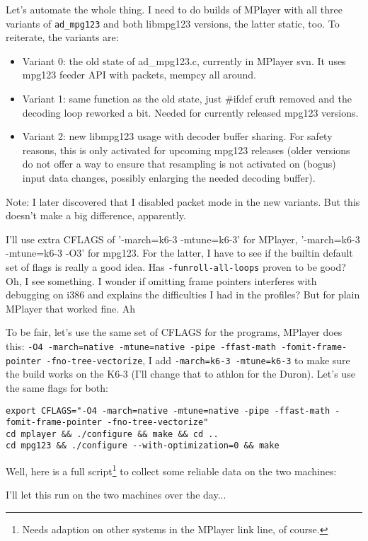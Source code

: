 \documentclass[a4paper,12pt]{scrartcl}
\begin{document}
Let's automate the whole thing. I need to do builds of MPlayer with all three variants of \verb:ad_mpg123: and both libmpg123 versions, the latter static, too.
To reiterate, the variants are:
\begin{itemize}
	\item Variant 0: the old state of ad\_mpg123.c, currently in MPlayer svn. It uses mpg123 feeder API with packets,  mempcy all around.
	\item Variant 1: same function as the old state, just \#ifdef cruft removed and the decoding loop reworked a bit. Needed for currently released mpg123 versions.
	\item Variant 2: new libmpg123 usage with decoder buffer sharing. For safety reasons, this is only activated for upcoming mpg123 releases (older versions do not offer a way to ensure that resampling is not activated on (bogus) input data changes, possibly enlarging the needed decoding buffer).
\end{itemize}
Note: I later discovered that I disabled packet mode in the new variants. But this doesn't make a big difference, apparently.

I'll use extra CFLAGS of '-march=k6-3 -mtune=k6-3' for MPlayer, '-march=k6-3 -mtune=k6-3 -O3' for mpg123. For the latter, I have to see if the builtin default set of flags is really a good idea. Has \verb:-funroll-all-loops: proven to be good? Oh, I see something. I wonder if omitting frame pointers interferes with debugging on i386 and explains the difficulties I had in the profiles? But for plain MPlayer that worked fine. Ah

To be fair, let's use the same set of CFLAGS for the programs, MPlayer does this: \verb:-O4 -march=native -mtune=native -pipe -ffast-math -fomit-frame-pointer -fno-tree-vectorize:, I add \verb:-march=k6-3 -mtune=k6-3: to make sure the build works on the K6-3 (I'll change that to athlon for the Duron). Let's use the same flags for both:

\begin{verbatim}
export CFLAGS="-O4 -march=native -mtune=native -pipe -ffast-math -fomit-frame-pointer -fno-tree-vectorize"
cd mplayer && ./configure && make && cd ..
cd mpg123 && ./configure --with-optimization=0 && make
\end{verbatim}

Well, here is a full script\footnote{Needs adaption on other systems in the MPlayer link line, of course.} to collect some reliable data on the two machines:

I'll let this run on the two machines over the day...
\end{document}
